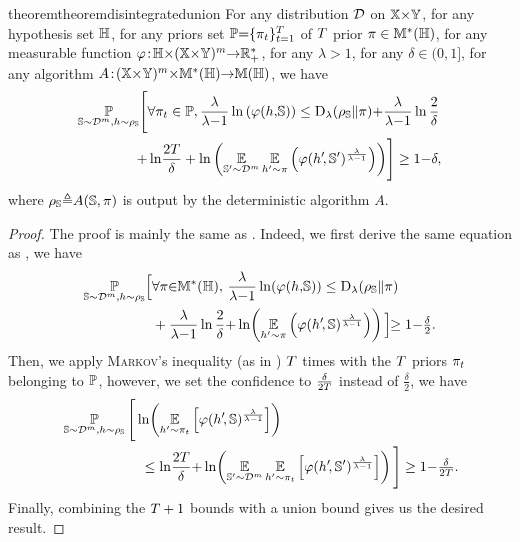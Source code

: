 \begin{noaddcontents}
\begin{restatable}{theorem}{theoremdisintegratedunion} For any distribution $\mathcal{D}$ on $\mathbb{X}{\times}\mathbb{Y}$, for any hypothesis set $\mathbb{H}$,  for any priors set $\mathbb{P}{=}\{\pi_t\}_{t=1}^T$ of $T$ prior $\pi\in\mathbb{M}^{*}(\mathbb{H})$, for any measurable function $\varphi\!:\! \mathbb{H}{\times}(\mathbb{X}{\times}\mathbb{Y})^{m}{\to} \mathbb{R}_{+}^*$, for any $\lambda\!>\!1$, for any $\delta\in(0,1]$, for any algorithm $A\!:\!(\mathbb{X}{\times}\mathbb{Y})^{m}{\times}\mathbb{M}^{*}(\mathbb{H}){\to} \mathbb{M}(\mathbb{H})$, we have
\begin{align*}
    \operatorname*{\mathbb{P}}_{\mathbb{S}\sim\mathcal{D}^{m},h\sim \rho_{\mathbb{S}}}\!\Bigg[&\forall \pi_t\in\mathbb{P}, \frac{\lambda}{\lambda{-}1}\ln\left(\varphi(h,\!\mathbb{S})\right) \le \operatorname{D}_{\lambda}(\rho_{\mathbb{S}}\|\pi){+} \frac{\lambda}{\lambda{-}1}\ln\frac{2}{\delta}\\
    + &\ln\!\frac{2T}{\delta} + \ln\left(\operatorname*{\mathbb{E}}_{\mathbb{S}'{\sim}\mathcal{D}^{m}}\operatorname*{\mathbb{E}}_{h'{\sim}\pi}\left(\varphi(h'\!, \mathbb{S}')^{\frac{\lambda}{\lambda{-}1}}\right)\right)\!\Bigg]\ge 1{-}\delta,
\end{align*}
where $\rho_{\mathbb{S}}{\triangleq}A(\mathbb{S}, \pi)$ is output by the deterministic algorithm $A$.
\label{chap:dis-pra:theorem:disintegrated-union}
\end{restatable}

\begin{proof} The proof is mainly the same as .
Indeed, we first derive the same equation as , we have
\begin{align*}
    \operatorname*{\mathbb{P}}_{\mathbb{S}\sim\mathcal{D}^{m},h\sim \rho_{\mathbb{S}}}\!\Big[&\forall\pi{\in}\mathbb{M}^{*}(\mathbb{H}),\,\frac{\lambda}{\lambda{-}1}\ln\!\left(\varphi(h,\!\mathbb{S})\right) \le \operatorname{D}_{\lambda}( \rho_{\mathbb{S}}\|\pi)\\
    &+ \frac{\lambda}{\lambda{-}1}\ln\frac{2}{\delta}{+}\ln\!\left(\operatorname*{\mathbb{E}}_{h'{\sim}\pi}\left(\varphi(h'\!, \mathbb{S})^{\frac{\lambda}{\lambda-1}}\right)\right)\Big]\!\!\ge 1{-}\tfrac{\delta}{2}.
\end{align*}
Then, we apply \textsc{Markov}'s inequality (as in ) $T$ times with the $T$ priors $\pi_t$ belonging to $\mathbb{P}$, however, we set the confidence to $\frac{\delta}{2T}$ instead of $\tfrac{\delta}{2}$, we have 
\begin{align*}
    &\operatorname*{\mathbb{P}}_{\mathbb{S}\sim\mathcal{D}^{m},h\sim \rho_{\mathbb{S}}}\Bigg[\ln\!\left(\operatorname*{\mathbb{E}}_{h'{\sim}\pi_t}\left[\varphi(h'\!, \mathbb{S})^{\frac{\lambda}{\lambda{-}1}}\right]\right)\\
    &\hspace{2cm}\le \ln\!\frac{2T}{\delta}{+}\ln\!\left(\operatorname*{\mathbb{E}}_{\mathbb{S}'{\sim}\mathcal{D}^{m}}\operatorname*{\mathbb{E}}_{h'{\sim}\pi_t}\left[\varphi(h'\!, \mathbb{S}')^{\frac{\lambda}{\lambda-1}}\right]\right)\Bigg]\ge1{-}\tfrac{\delta}{2T}.
\end{align*}
Finally, combining the $T+1$ bounds with a union bound gives us the desired result.
\end{proof}


\end{noaddcontents}
